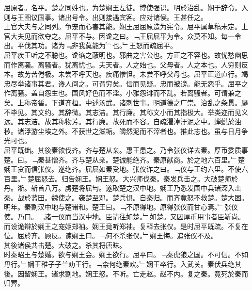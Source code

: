 \documentclass{zhvt-classic}
\begin{document}

\hspace*{2em}屈原者。名平。楚之同姓也。为楚娴王左徒。博使强识。明於治乱。娴于辞令。入则与王图议国事。诸出号令。出则接遇宾客。应对诸侯。王甚任之。\\
\hspace*{2em}上官大夫与之同列。争宠而心害其能。娴王屈屈原造为宪令。屈平属草稿未定。上官大夫见而欲夺之。屈平不与。因谗之曰。﹁王屈屈平为令。众莫不知。每一令出。平伐其功。诸为﹃非我莫能为﹄也。﹂王怒而疏屈平。\\
\hspace*{2em}屈平疾王听之不聪也。谗谄之蔽明也。邪曲之害公也。方正之不容也。故忧愁幽思而作离骚。离骚者。犹离忧也。夫天者。人之始也。父母者。人之本也。人穷则反本。故劳苦倦极。未尝不呼天也。疾痛惨怛。未尝不呼父母也。屈平正道直行。竭忠尽举诸事其君。谗人间之。可谓穷矣。信而见疑。忠而被谤。能无怨乎。屈平之作离骚。盖自怨生也。国风好色而不淫。小雅怨诽而不乱。若离骚者。可谓兼之矣。上称帝喾。下道齐桓。中述汤武。诸刺世事。明道德之广崇。治乱之条贯。靡不毕见。其文约。其辞微。其志洁。其行廉。其称文小而其指极大。举类迩而见义远。其志洁。故其称物芳。其行廉。故死而不容。自疏濯淖汙泥之中。蝉蜕於浊秽。诸浮游尘埃之外。不获世之滋垢。皭然泥而不滓者也。推此志也。虽与日月争光可也。\\
\hspace*{2em}屈平既绌。其後秦欲伐齐。齐与楚从亲。惠王患之。乃令张仪详去秦。厚币委质事楚。曰。﹁秦甚憎齐。齐与楚从亲。楚诚能绝齐。秦原献商。於之地六百里。﹂楚娴王贪而信张仪。遂绝齐。屈屈如秦受地。张仪诈之曰。﹁仪与王约六里。不使六百里。﹂楚屈怒去。归告娴王。娴王怒。大兴师伐秦。秦发兵击之。大破楚师於丹。淅。斩首八万。虏楚将屈匄。遂取楚之汉中地。娴王乃悉发国中兵诸深入击秦。战於蓝田。魏使之。袭楚至邓。楚兵惧。自秦归。而齐竟怒不救楚。楚大困。\\
\hspace*{2em}明年。秦割汉中地与楚诸和。楚王曰。﹁不原得地。原得张仪而甘心焉。﹂张仪使。乃曰。﹁诸一仪而当汉中地。臣请往如楚。﹂如楚。又因厚币用事者臣靳尚。而设诡辩於娴王之宠姬郑袖。娴王竟听郑袖。复释去张仪。是时屈平既疏。不复在位。屈於齐。顾反。谏娴王曰。﹁何不杀张仪。﹂娴王悔。追张仪不及。\\
\hspace*{2em}其後诸侯共击楚。大破之。杀其将唐眛。\\
\hspace*{2em}时秦昭王与楚婚。欲与娴王会。娴王欲行。屈平曰。﹁秦虎狼之国。不可信。不如毋行。﹂娴王稚子子兰劝王行。﹁柰何绝秦欢。﹂娴王卒行。入武关。秦伏兵绝其後。因留娴王。诸求割地。娴王怒。不听。亡走赵。赵不内。复之秦。竟死於秦而归葬。\\
\end{document}
